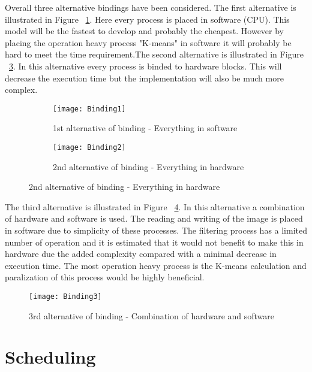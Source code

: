 Overall three alternative bindings have been considered. The first alternative is illustrated in Figure ~\ref{fig:Binding1}. Here every process is placed in software (CPU). This model will be the fastest to develop and probably the cheapest. However by placing the operation heavy process "K-means" in software it will probably be hard to meet the time requirement.The second alternative is illustrated in Figure ~\ref{fig:Binding2}. In this alternative every process is binded to hardware blocks. This will decrease the execution time but the implementation will also be much more complex.

\begin{figure}[H]
\centering
\begin{subfigure}{.5\textwidth}
	\centering
	\texttt{[image: Binding1]}
	\caption{1st alternative of binding - Everything in software}
	\label{fig:Binding1}
\end{subfigure}%
\begin{subfigure}{.5\textwidth}
	\centering
	\texttt{[image: Binding2]}
	\caption{2nd alternative of binding - Everything in hardware}
	\label{fig:Binding2}
\end{subfigure}%
\end{figure}

The third alternative is illustrated in Figure ~\ref{fig:Binding3}. In this alternative a combination of hardware and software is used. The reading and writing of the image is placed in software due to simplicity of these processes. The filtering process has a limited number of operation and it is estimated that it would not benefit to make this in hardware due the added complexity compared with a minimal decrease in execution time. The most operation heavy process is the K-means calculation and paralization of this process would be highly beneficial.

\begin{figure}[H]
	\centering
	\texttt{[image: Binding3]}
	\caption{3rd alternative of binding - Combination of hardware and software}
	\label{fig:Binding3}
\end{figure}


\section{Scheduling}
